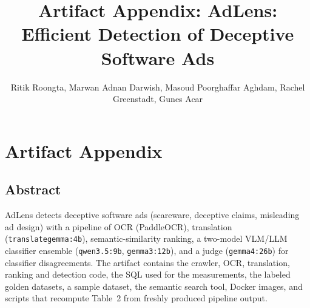 \documentclass[sigconf,nonacm]{acmart}
\begin{document}
\title{Artifact Appendix: AdLens: Efficient Detection of Deceptive Software Ads}
\author{Ritik Roongta, Marwan Adnan Darwish, Masoud Poorghaffar Aghdam, Rachel Greenstadt, Gunes Acar}
\maketitle

\section{Artifact Appendix}

\subsection{Abstract}
AdLens detects deceptive software ads (scareware, deceptive claims, misleading ad design) with a pipeline of
OCR (PaddleOCR), translation (\texttt{translategemma:4b}), semantic-similarity ranking, a two-model VLM/LLM
classifier ensemble (\texttt{qwen3.5:9b}, \texttt{gemma3:12b}), and a judge (\texttt{gemma4:26b}) for
classifier disagreements. The artifact contains the crawler, OCR, translation, ranking and detection code,
the SQL used for the measurements, the labeled golden datasets, a sample dataset, the semantic search tool,
Docker images, and scripts that recompute Table~2 from freshly produced pipeline output.
\end{document}
